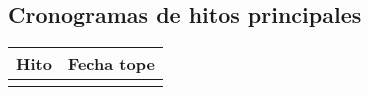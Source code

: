 \subsection{Cronogramas de hitos principales}

\begin{table}[h]
\begin{tabular}{|l|l|}
\hline
\textbf{Hito} & \textbf{Fecha tope} \\ \hline
              &                     \\ \hline
\end{tabular}
\end{table}
